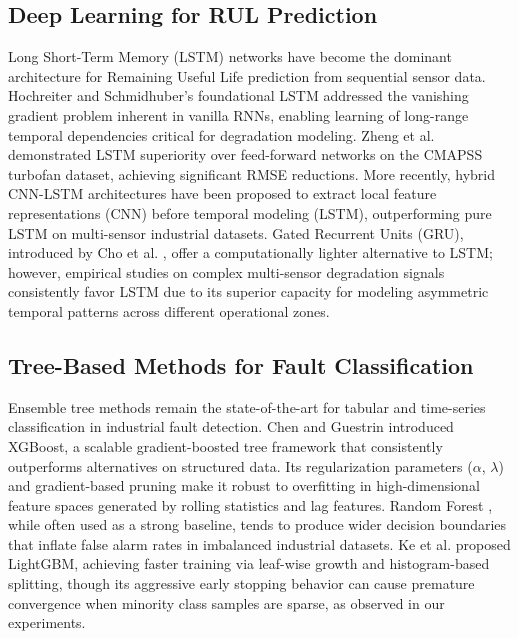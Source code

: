 \documentclass[conference]{IEEEtran}
\begin{document}
\subsection{Deep Learning for RUL Prediction}
Long Short-Term Memory (LSTM) networks have become the dominant architecture for Remaining Useful Life prediction from sequential sensor data. Hochreiter and Schmidhuber's foundational LSTM \cite{hochreiter1997lstm} addressed the vanishing gradient problem inherent in vanilla RNNs, enabling learning of long-range temporal dependencies critical for degradation modeling. Zheng et al. \cite{zheng2017lstm_rul} demonstrated LSTM superiority over feed-forward networks on the CMAPSS turbofan dataset, achieving significant RMSE reductions. More recently, hybrid CNN-LSTM architectures \cite{li2018cnnlstm} have been proposed to extract local feature representations (CNN) before temporal modeling (LSTM), outperforming pure LSTM on multi-sensor industrial datasets. Gated Recurrent Units (GRU), introduced by Cho et al. \cite{cho2014gru}, offer a computationally lighter alternative to LSTM; however, empirical studies on complex multi-sensor degradation signals consistently favor LSTM due to its superior capacity for modeling asymmetric temporal patterns across different operational zones.

\subsection{Tree-Based Methods for Fault Classification}
Ensemble tree methods remain the state-of-the-art for tabular and time-series classification in industrial fault detection. Chen and Guestrin \cite{chen2016xgboost} introduced XGBoost, a scalable gradient-boosted tree framework that consistently outperforms alternatives on structured data. Its regularization parameters ($\alpha$, $\lambda$) and gradient-based pruning make it robust to overfitting in high-dimensional feature spaces generated by rolling statistics and lag features. Random Forest \cite{breiman2001rf}, while often used as a strong baseline, tends to produce wider decision boundaries that inflate false alarm rates in imbalanced industrial datasets. Ke et al. \cite{ke2017lightgbm} proposed LightGBM, achieving faster training via leaf-wise growth and histogram-based splitting, though its aggressive early stopping behavior can cause premature convergence when minority class samples are sparse, as observed in our experiments.
\end{document}
